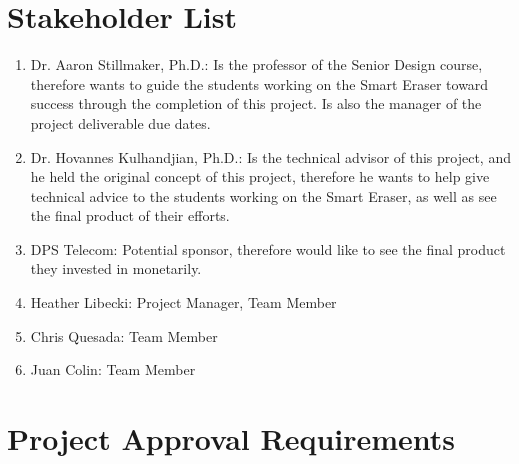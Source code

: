  
 \section{Stakeholder List}
 \begin{enumerate}
 	\item	Dr. Aaron Stillmaker, Ph.D.: Is the professor of the Senior Design course, therefore wants to guide the students working on the Smart Eraser toward success through the completion of this project. Is also the manager of the project deliverable due dates.\\ 
 	\item   Dr. Hovannes Kulhandjian, Ph.D.: Is the technical advisor of this project, and he held the original concept of this project, therefore he wants to help give technical advice to the students working on the Smart Eraser, as well as see the final product of their efforts.\\
 	\item	DPS Telecom: Potential sponsor, therefore would like to see the final product they invested in monetarily.\\
 	\item	Heather Libecki: Project Manager, Team Member\\
 	\item	Chris Quesada: Team Member\\
	\item 	Juan Colin: Team Member\\
 	 	
 \end{enumerate}
 
 \section{Project Approval Requirements}
 
 \pagebreak

